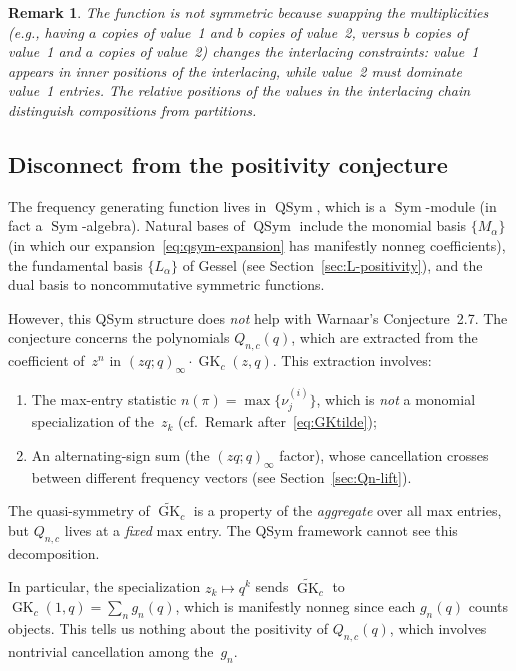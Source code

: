 \documentclass[11pt]{article}
\newtheorem{remark}[theorem]{Remark}
\newcommand{\GK}{\operatorname{GK}}
\newcommand{\qpoch}[2]{(#1;#2)_\infty}
\newcommand{\QSym}{\operatorname{QSym}}
\newcommand{\Sym}{\operatorname{Sym}}
\begin{document}
\begin{remark}
The function is not symmetric because swapping the
\emph{multiplicities} (e.g., having $a$ copies of value~1 and $b$
copies of value~2, versus $b$ copies of value~1 and $a$ copies of
value~2) changes the interlacing constraints: value~1 appears in
inner positions of the interlacing, while value~2 must dominate
value~1 entries. The relative \emph{positions} of the values in the
interlacing chain distinguish compositions from partitions.
\end{remark}

\subsection{Disconnect from the positivity conjecture}

The frequency generating function lives in $\QSym$, which is a
$\Sym$-module (in fact a $\Sym$-algebra). Natural bases of $\QSym$
include the monomial basis $\{M_\alpha\}$ (in which our
expansion~\eqref{eq:qsym-expansion} has manifestly nonneg
coefficients), the fundamental basis $\{L_\alpha\}$ of Gessel
(see Section~\ref{sec:L-positivity}), and the dual basis to
noncommutative symmetric functions.

However, this QSym structure does \emph{not} help with
Warnaar's Conjecture~2.7. The conjecture concerns the
polynomials $Q_{n,c}(q)$, which are extracted from
the coefficient of~$z^n$ in $\qpoch{zq}{q} \cdot \GK_c(z,q)$.
This extraction involves:
\begin{enumerate}
  \item The max-entry statistic $n(\pi) = \max\{\nu^{(i)}_j\}$,
    which is \emph{not} a monomial specialization of the~$z_k$
    (cf.\ Remark after~\eqref{eq:GKtilde});
  \item An alternating-sign sum (the $(zq;q)_\infty$ factor),
    whose cancellation crosses between different frequency vectors
    (see Section~\ref{sec:Qn-lift}).
\end{enumerate}
The quasi-symmetry of $\widetilde{\GK}_c$ is a property of the
\emph{aggregate} over all max entries, but $Q_{n,c}$ lives at
a \emph{fixed} max entry. The QSym framework cannot see this
decomposition.

In particular, the specialization $z_k \mapsto q^k$ sends
$\widetilde{\GK}_c$ to $\GK_c(1,q) = \sum_n g_n(q)$, which is
manifestly nonneg since each $g_n(q)$ counts objects. This tells
us nothing about the positivity of $Q_{n,c}(q)$, which involves
nontrivial cancellation among the~$g_n$.
\end{document}
